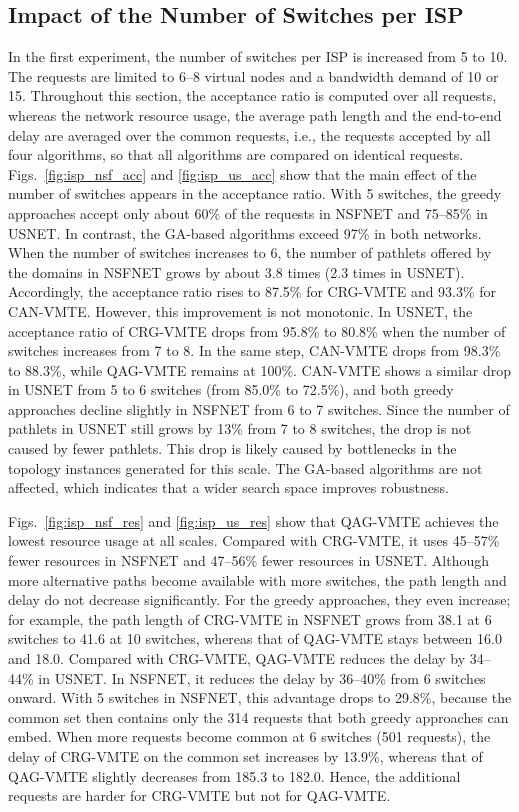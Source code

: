\subsection{Impact of the Number of Switches per ISP}
\label{subsec:isp}

In the first experiment, the number of switches per ISP is increased from 5 to 10. The requests are limited to 6--8 virtual nodes and a bandwidth demand of 10 or 15. Throughout this section, the acceptance ratio is computed over all requests, whereas the network resource usage, the average path length and the end-to-end delay are averaged over the common requests, i.e., the requests accepted by all four algorithms, so that all algorithms are compared on identical requests. Figs.~\ref{fig:isp_nsf_acc} and \ref{fig:isp_us_acc} show that the main effect of the number of switches appears in the acceptance ratio. With 5 switches, the greedy approaches accept only about 60\% of the requests in NSFNET and 75--85\% in USNET. In contrast, the GA-based algorithms exceed 97\% in both networks. When the number of switches increases to 6, the number of pathlets offered by the domains in NSFNET grows by about 3.8 times (2.3 times in USNET). Accordingly, the acceptance ratio rises to 87.5\% for CRG-VMTE and 93.3\% for CAN-VMTE. However, this improvement is not monotonic. In USNET, the acceptance ratio of CRG-VMTE drops from 95.8\% to 80.8\% when the number of switches increases from 7 to 8. In the same step, CAN-VMTE drops from 98.3\% to 88.3\%, while QAG-VMTE remains at 100\%. CAN-VMTE shows a similar drop in USNET from 5 to 6 switches (from 85.0\% to 72.5\%), and both greedy approaches decline slightly in NSFNET from 6 to 7 switches. Since the number of pathlets in USNET still grows by 13\% from 7 to 8 switches, the drop is not caused by fewer pathlets. This drop is likely caused by bottlenecks in the topology instances generated for this scale. The GA-based algorithms are not affected, which indicates that a wider search space improves robustness.

Figs.~\ref{fig:isp_nsf_res} and \ref{fig:isp_us_res} show that QAG-VMTE achieves the lowest resource usage at all scales. Compared with CRG-VMTE, it uses 45--57\% fewer resources in NSFNET and 47--56\% fewer resources in USNET. Although more alternative paths become available with more switches, the path length and delay do not decrease significantly. For the greedy approaches, they even increase; for example, the path length of CRG-VMTE in NSFNET grows from 38.1 at 6 switches to 41.6 at 10 switches, whereas that of QAG-VMTE stays between 16.0 and 18.0. Compared with CRG-VMTE, QAG-VMTE reduces the delay by 34--44\% in USNET. In NSFNET, it reduces the delay by 36--40\% from 6 switches onward. With 5 switches in NSFNET, this advantage drops to 29.8\%, because the common set then contains only the 314 requests that both greedy approaches can embed. When more requests become common at 6 switches (501 requests), the delay of CRG-VMTE on the common set increases by 13.9\%, whereas that of QAG-VMTE slightly decreases from 185.3 to 182.0. Hence, the additional requests are harder for CRG-VMTE but not for QAG-VMTE.

